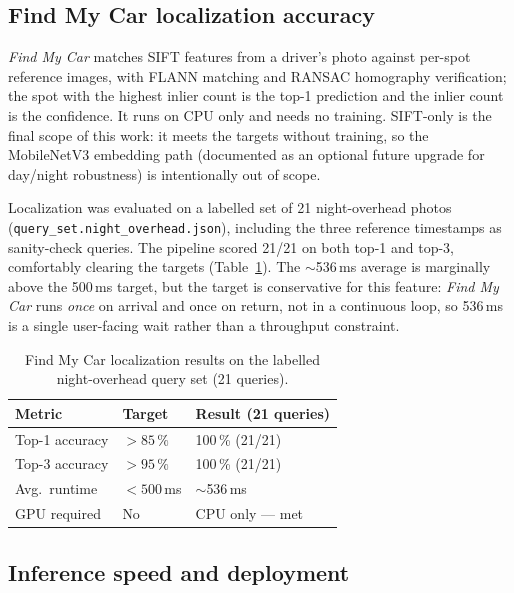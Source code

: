 \documentclass[10pt,twocolumn,letterpaper]{article}
\begin{document}
\subsection{Find My Car localization accuracy}
\label{sec:fmc-eval}

\emph{Find My Car} matches SIFT features from a driver's photo against
per-spot reference images, with FLANN matching and RANSAC homography
verification; the spot with the highest inlier count is the top-1
prediction and the inlier count is the confidence. It runs on CPU only and
needs no training. SIFT-only is the final scope of this work: it
meets the targets without training, so the MobileNetV3 embedding path
(documented as an optional future upgrade for day/night robustness) is
intentionally out of scope.

Localization was evaluated on a labelled set of 21 night-overhead photos
(\texttt{query\_set.night\_overhead.json}), including the three reference
timestamps as sanity-check queries. The pipeline scored 21/21 on both
top-1 and top-3, comfortably clearing the targets (Table~\ref{tab:fmc}).
The $\sim$536\,ms average is marginally above the 500\,ms target, but the
target is conservative for this feature: \emph{Find My Car} runs
\emph{once} on arrival and once on return, not in a continuous loop, so
536\,ms is a single user-facing wait rather than a throughput constraint.

\begin{table}[H]
\centering\small
\begin{tabular}{lll}
\toprule
\textbf{Metric} & \textbf{Target} & \textbf{Result (21 queries)} \\
\midrule
Top-1 accuracy & $>85\,\%$ & 100\,\% (21/21) \\
Top-3 accuracy & $>95\,\%$ & 100\,\% (21/21) \\
Avg.\ runtime  & $<500$\,ms & $\sim$536\,ms \\
GPU required   & No & CPU only --- met \\
\bottomrule
\end{tabular}
\caption{Find My Car localization results on the labelled night-overhead
query set (21 queries).}
\label{tab:fmc}
\end{table}

\subsection{Inference speed and deployment}
\label{sec:speed-sub}
\end{document}
